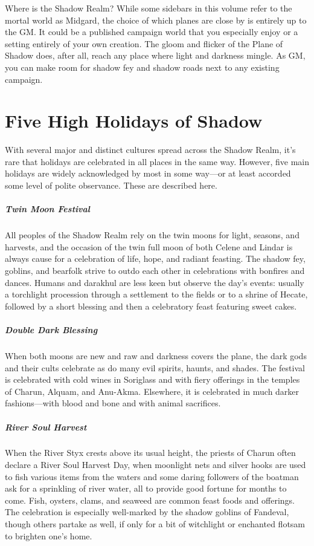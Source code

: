 \documentclass[10pt,a4paper,twoside,bg=print,twocolumn,openany,nodeprecatedcode]{dndbook}
\begin{document}
\begin{DndSidebar}[float=!b]{Where is the Shadow Realm?}
While some sidebars in this volume refer to the mortal world as Midgard, the choice of which planes are close by is entirely up to the GM. It could be a published campaign world that you especially enjoy or a setting entirely of your own creation. The gloom and flicker of the Plane of Shadow does, after all, reach any place where light and darkness mingle. As GM, you can make room for shadow fey and shadow roads next to any existing campaign.



\end{DndSidebar}

\section{Five High Holidays of Shadow}
With several major and distinct cultures spread across the Shadow Realm, it's rare that holidays are celebrated in all places in the same way. However, five main holidays are widely acknowledged by most in some way—or at least accorded some level of polite observance. These are described here.

\subparagraph{Twin Moon Festival}
All peoples of the Shadow Realm rely on the twin moons for light, seasons, and harvests, and the occasion of the twin full moon of both Celene and Lindar is always cause for a celebration of life, hope, and radiant feasting. The shadow fey, goblins, and bearfolk strive to outdo each other in celebrations with bonfires and dances. Humans and darakhul are less keen but observe the day's events: usually a torchlight procession through a settlement to the fields or to a shrine of Hecate, followed by a short blessing and then a celebratory feast featuring sweet cakes.

\subparagraph{Double Dark Blessing}
When both moons are new and raw and darkness covers the plane, the dark gods and their cults celebrate as do many evil spirits, haunts, and shades. The festival is celebrated with cold wines in Soriglass and with fiery offerings in the temples of Charun, Alquam, and Anu-Akma. Elsewhere, it is celebrated in much darker fashions—with blood and bone and with animal sacrifices.

\subparagraph{River Soul Harvest}
When the River Styx crests above its usual height, the priests of Charun often declare a River Soul Harvest Day, when moonlight nets and silver hooks are used to fish various items from the waters and some daring followers of the boatman ask for a sprinkling of river water, all to provide good fortune for months to come. Fish, oysters, clams, and seaweed are common feast foods and offerings. The celebration is especially well-marked by the shadow goblins of Fandeval, though others partake as well, if only for a bit of witchlight or enchanted flotsam to brighten one's home.
\end{document}
